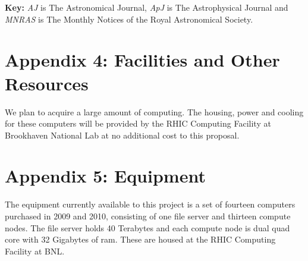 \documentclass[12pt]{article}
\begin{document}
\newpage
{}
\renewcommand{\refname}{\section*{Appendix 3: Bibliography for Narrative}\label{app:bib}}


\vspace{5mm}
\noindent
{\bf Key:} {\it AJ} is The Astronomical Journal, {\it ApJ} is The 
Astrophysical Journal and {\it MNRAS} is The Monthly Notices of the Royal
Astronomical Society.






\newpage
{}
\section*{Appendix 4: Facilities and Other Resources}

We plan to acquire a large amount of computing.  The housing, power and cooling
for these computers will be provided by the RHIC Computing Facility at
Brookhaven National Lab at no additional cost to this proposal.		

\newpage
{}
\section*{Appendix 5: Equipment}

The equipment currently available to this project is a set of fourteen
computers purchased in 2009 and 2010, consisting of one file server and
thirteen compute nodes.  The file server holds 40 Terabytes and each compute
node is dual quad core with 32 Gigabytes of ram.  These are housed at the RHIC
Computing Facility at BNL.
\end{document}

